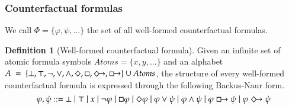 \documentclass[a4paper,american]{paper}
\theoremstyle{definition}\newtheorem{definition}{Definition}
\begin{document}
\subsubsection{Counterfactual formulas}
We call $\Phi = \{\varphi ,\psi ,...\}$ the set of all well-formed counterfactual formulas.
\begin{definition}[Well-formed counterfactual formula]
Given an infinite set of atomic formula symbols $Atoms = \{ x, y, ...\}$ and an alphabet $A~=~\{\bot ,\top ,\neg ,\vee ,\wedge ,\Diamond ,\Box ,\Diamondright ,\boxright\}\cup Atoms$, the structure of every well-formed counterfactual formula is expressed through the following Backus-Naur form.
\begin{equation}
\varphi, \psi ::= \bot \mid \top \mid x \mid \neg \varphi \mid \Box \varphi \mid \Diamond \varphi \mid \varphi \vee \psi \mid \varphi \wedge \psi \mid \varphi \boxright \psi \mid \varphi \Diamondright \psi
\end{equation}
\end{definition}
\end{document}
